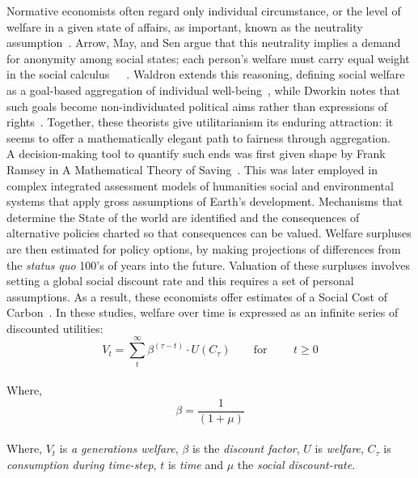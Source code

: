\documentclass[12pt, oneside]{article}   	%
\begin{document}
Normative economists often regard only individual circumstance, or the level of welfare in a given state of affairs, as important, known as the neutrality assumption~\cite{pd2}.
Arrow, May, and Sen argue that this neutrality implies a demand for anonymity among social states; each person’s welfare must carry equal weight in the social calculus~\cite{ka1}~\cite{km1}~\cite{as2}.
Waldron extends this reasoning, defining social welfare as a goal-based aggregation of individual well-being~\cite{jw2}, while Dworkin notes that such goals become non-individuated political aims rather than expressions of rights~\cite{rd1}.
Together, these theorists give utilitarianism its enduring attraction: it seems to offer a mathematically elegant path to fairness through aggregation.\\

A decision-making tool to quantify such ends was first given shape by Frank Ramsey in A Mathematical Theory of Saving~\cite{fr1}.
This was later employed in complex integrated assessment models of humanities social and environmental systems that apply gross assumptions of Earth's development.
Mechanisms that determine the State of the world are identified and the consequences of alternative policies charted so that consequences can be valued.
Welfare surpluses are then estimated for policy options, by making projections of differences from the \emph{status quo} 100's of years into the future.
Valuation of these surpluses involves setting a global social discount rate and this requires a set of personal assumptions.
As a result, these economists offer estimates of a Social Cost of Carbon~\cite{pd2}.
In these studies, welfare over time is expressed as an infinite series of discounted utilities:\\

\begin{equation}
V_t = \sum_t^\infty \beta^{(\tau - t)} \cdot U (C_\tau)
\qquad \text{for }
\qquad t \geq 0
\end{equation}\\

Where,
\begin{equation}
\beta = \frac{1}{(1+\mu)}
\end{equation}\\

Where, $V_t$ is \emph{a generations welfare}, $\beta$ is the \emph{discount factor}, $U$ is \emph{welfare}, $C_\tau$ is \emph{consumption during time-step}, $t$ is \emph{time} and $\mu$ the \emph{social discount-rate}.\\
\end{document}
